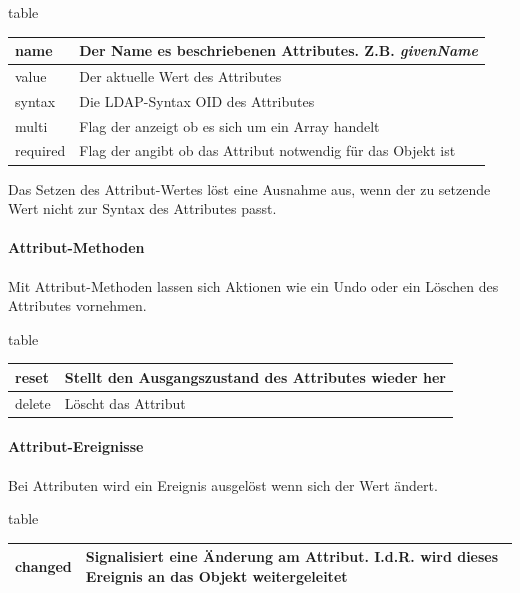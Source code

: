 \begin{nofloat}{table}
 \begin{center}
  \begin{tabularx}{\textwidth}[]{|X|X|}
   \hline
   name     & Der Name es beschriebenen Attributes. Z.B. \textit{givenName} \\
   \hline
   value    & Der aktuelle Wert des Attributes \\
   \hline
   syntax   & Die LDAP-Syntax OID des Attributes \\
   \hline
   multi    & Flag der anzeigt ob es sich um ein Array handelt \\
   \hline
   required & Flag der angibt ob das Attribut notwendig für das Objekt ist \\
   \hline
  \end{tabularx}
 \end{center}
\end{nofloat}

Das Setzen des Attribut-Wertes löst eine Ausnahme aus, wenn der zu setzende
Wert nicht zur Syntax des Attributes passt.

\paragraph{Attribut-Methoden}

Mit Attribut-Methoden lassen sich Aktionen wie ein Undo oder ein Löschen des
Attributes vornehmen.

\begin{nofloat}{table}
 \begin{center}
  \begin{tabularx}{\textwidth}[]{|X|X|}
   \hline
   reset    & Stellt den Ausgangszustand des Attributes wieder her\\
   \hline
   delete   & Löscht das Attribut\\
   \hline
  \end{tabularx}
 \end{center}
\end{nofloat}

\paragraph{Attribut-Ereignisse}

Bei Attributen wird ein Ereignis ausgelöst wenn sich der Wert ändert.

\begin{nofloat}{table}
 \begin{center}
  \begin{tabularx}{\textwidth}[]{|X|X|}
   \hline
   changed    & Signalisiert eine Änderung am Attribut. I.d.R. wird dieses Ereignis an das Objekt weitergeleitet\\
   \hline
  \end{tabularx}
 \end{center}
\end{nofloat}

